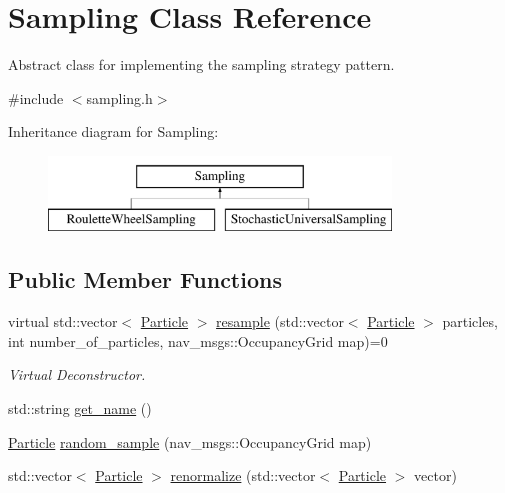 \hypertarget{classSampling}{\section{Sampling Class Reference}
\label{classSampling}
}


Abstract class for implementing the sampling strategy pattern.  




{\ttfamily \#include $<$sampling.\-h$>$}

Inheritance diagram for Sampling\-:\begin{figure}[H]
\begin{center}
\leavevmode
\includegraphics[height=2.000000cm]{classSampling}
\end{center}
\end{figure}
\subsection*{Public Member Functions}
\begin{DoxyCompactItemize}
\item 
virtual std\-::vector$<$ \hyperlink{classParticle}{Particle} $>$ \hyperlink{classSampling_ae9a5648926dda0a5d5ed4b55b9d96436}{resample} (std\-::vector$<$ \hyperlink{classParticle}{Particle} $>$ particles, int number\-\_\-of\-\_\-particles, nav\-\_\-msgs\-::\-Occupancy\-Grid map)=0
\begin{DoxyCompactList}\small\item\em Virtual Deconstructor. \end{DoxyCompactList}\item 
std\-::string \hyperlink{classSampling_ac355e000a52390164b1aaef3bdb384d2}{get\-\_\-name} ()
\item 
\hyperlink{classParticle}{Particle} \hyperlink{classSampling_acc4b8eb8fb757ee597b11594ce04f875}{random\-\_\-sample} (nav\-\_\-msgs\-::\-Occupancy\-Grid map)
\item 
std\-::vector$<$ \hyperlink{classParticle}{Particle} $>$ \hyperlink{classSampling_ae6b476b809237740fa413849caf6cab4}{renormalize} (std\-::vector$<$ \hyperlink{classParticle}{Particle} $>$ vector)
\end{DoxyCompactItemize}
